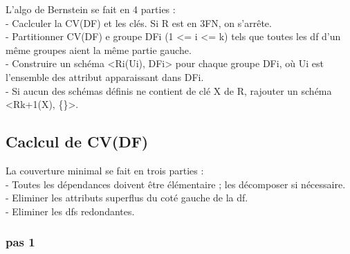 \documentclass[a4paper,sffamily,12pt]{article}
\begin{document}
				L'algo de Bernstein se fait en 4 parties : \\
					- Caclculer la CV(DF) et les clés. Si R est en 3FN, on s'arrête. \\
					- Partitionner CV(DF) e groupe DFi (1 <= i <= k) tels que toutes les df d'un même groupes aient la même partie gauche. \\
					- Construire un schéma <Ri(Ui), DFi> pour chaque groupe DFi, où Ui est l'ensemble des attribut apparaissant dans DFi. \\
					- Si aucun des schémas définis ne contient de clé X de R, rajouter un schéma <Rk+1(X), \{\}>. \\	
	
				\subsection{Caclcul de CV(DF)}
		
					La couverture minimal se fait en trois parties : \\
						- Toutes les dépendances doivent être élémentaire ; les décomposer si nécessaire. \\
						- Eliminer les attributs superflus du coté gauche de la df. \\
						- Eliminer les dfs redondantes.
					
					\subsubsection{pas 1}
		
\end{document}
